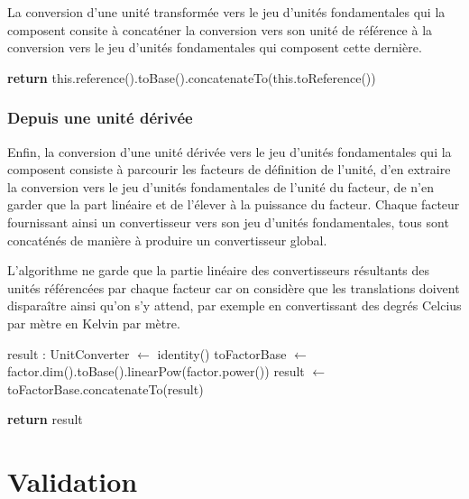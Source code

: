 \documentclass[a4paper,twoside,10pt]{article}
\begin{document}
La conversion d'une unité transformée vers le jeu d'unités fondamentales qui la composent consite à concaténer la
conversion vers son unité de référence à la conversion vers le jeu d'unités fondamentales qui composent cette dernière.

\begin{algorithm}[!h]
\caption{Implémentation de TransformedUnit.toBase()}\label{transformedToBase}
\begin{algorithmic}
\State \textbf{return} this.reference().toBase().concatenateTo(this.toReference())
\EndProcedure
\end{algorithmic}
\end{algorithm}


\subsubsection{Depuis une unité dérivée}

Enfin, la conversion d'une unité dérivée vers le jeu d'unités fondamentales qui la composent consiste à parcourir les
facteurs de définition de l'unité, d'en extraire la conversion vers le jeu d'unités fondamentales de l'unité du facteur,
de n'en garder que la part linéaire et de l'élever à la puissance du facteur. Chaque facteur fournissant ainsi un
convertisseur vers son jeu d'unités fondamentales, tous sont concaténés de manière à produire un convertisseur global.

L'algorithme ne garde que la partie linéaire des convertisseurs résultants des unités référencées par chaque facteur car
on considère que les translations doivent disparaître ainsi qu'on s'y attend, par exemple en convertissant des degrés
Celcius par mètre en Kelvin par mètre.

\begin{algorithm}[!h]
\caption{Implémentation de DerivedUnit.toBase()}\label{derivedToBase}
\begin{algorithmic}

\State result : UnitConverter $\gets$ identity()
\State toFactorBase $\gets$ factor.dim().toBase().linearPow(factor.power())
\State result $\gets$ toFactorBase.concatenateTo(result)
\EndFor

\State \textbf{return} result
\EndProcedure
\end{algorithmic}
\end{algorithm}

\section{Validation}
\end{document}
